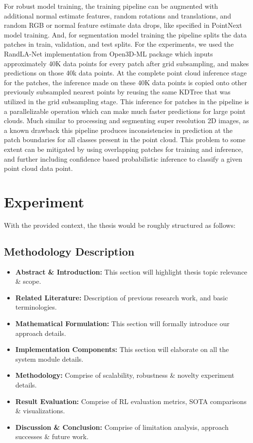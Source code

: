 \documentclass{article}
\begin{document}
For robust model training, the training pipeline can be augmented with additional normal estimate features, random rotations and translations, and random RGB or normal feature estimate data drops, like specified in PointNext model training.
And, for segmentation model training the pipeline splits the data patches in train, validation, and test splits.
For the experiments, we used the RandLA-Net implementation from Open3D-ML package which inputs approximately 40K data points for every patch after grid subsampling, and makes predictions on those 40k data points.
At the complete point cloud inference stage for the patches, the inference made on these 40K data points is copied onto other previously subsampled nearest points by reusing the same KDTree that was utilized in the grid subsampling stage.
This inference for patches in the pipeline is a parallelizable operation which can make much faster predictions for large point clouds.
Much similar to processing and segmenting super resolution 2D images, as a known drawback this pipeline produces inconsistencies in prediction at the patch boundaries for all classes present in the point cloud.
This problem to some extent can be mitigated by using overlapping patches for training and inference, and further including confidence based probabilistic inference to classify a given point cloud data point.


\iffalse
\section{Experiment}
With the provided context, the thesis would be roughly structured as follows:
\subsection{Methodology Description}
\begin{itemize}
  \item \textbf{Abstract \& Introduction:} This section will highlight thesis topic relevance \& scope.
  \item \textbf{Related Literature:} Description of previous research work, and basic terminologies.
  \item \textbf{Mathematical Formulation:} This section will formally introduce our approach details.
  \item \textbf{Implementation Components:} This section will elaborate on all the system module details.
  \item \textbf{Methodology:} Comprise of scalability, robustness \& novelty experiment details.
  \item \textbf{Result Evaluation:} Comprise of RL evaluation metrics, SOTA comparisons \& visualizations.
  \item \textbf{Discussion \& Conclusion:} Comprise of limitation analysis, approach successes \& future work.
\end{itemize}
\end{document}
